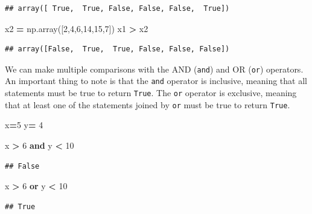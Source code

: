 \documentclass[
]{book}
\newenvironment{Shaded}{\begin{snugshade}}{\end{snugshade}}
\newcommand{\DecValTok}[1]{\textcolor[rgb]{0.00,0.00,0.81}{#1}}
\newcommand{\KeywordTok}[1]{\textcolor[rgb]{0.13,0.29,0.53}{\textbf{#1}}}
\newcommand{\NormalTok}[1]{#1}
\newcommand{\OperatorTok}[1]{\textcolor[rgb]{0.81,0.36,0.00}{\textbf{#1}}}
\begin{document}
\begin{verbatim}
## array([ True,  True, False, False, False,  True])
\end{verbatim}

\begin{Shaded}
\begin{Highlighting}[]
\NormalTok{x2 }\OperatorTok{=}\NormalTok{ np.array([}\DecValTok{2}\NormalTok{,}\DecValTok{4}\NormalTok{,}\DecValTok{6}\NormalTok{,}\DecValTok{14}\NormalTok{,}\DecValTok{15}\NormalTok{,}\DecValTok{7}\NormalTok{])}
\NormalTok{x1 }\OperatorTok{\textgreater{}}\NormalTok{ x2}
\end{Highlighting}
\end{Shaded}

\begin{verbatim}
## array([False,  True,  True, False, False, False])
\end{verbatim}

We can make multiple comparisons with the AND (\texttt{and}) and OR (\texttt{or}) operators. An important thing to note is that the \texttt{and} operator is inclusive, meaning that all statements must be true to return \texttt{True}. The \texttt{or} operator is exclusive, meaning that at least one of the statements joined by \texttt{or} must be true to return \texttt{True}.

\begin{Shaded}
\begin{Highlighting}[]
\NormalTok{x}\OperatorTok{=}\DecValTok{5} 
\NormalTok{y}\OperatorTok{=} \DecValTok{4}

\NormalTok{x }\OperatorTok{\textgreater{}} \DecValTok{6} \KeywordTok{and}\NormalTok{ y }\OperatorTok{\textless{}} \DecValTok{10}
\end{Highlighting}
\end{Shaded}

\begin{verbatim}
## False
\end{verbatim}

\begin{Shaded}
\begin{Highlighting}[]
\NormalTok{x }\OperatorTok{\textgreater{}} \DecValTok{6} \KeywordTok{or}\NormalTok{ y }\OperatorTok{\textless{}} \DecValTok{10}
\end{Highlighting}
\end{Shaded}

\begin{verbatim}
## True
\end{verbatim}
\end{document}
